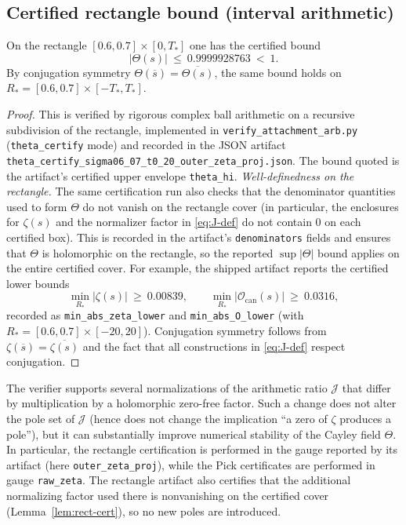 \documentclass[11pt]{article}
\begin{document}
\subsection*{Certified rectangle bound (interval arithmetic)}
\begin{lemma}\label{lem:rect-cert}
On the rectangle $[0.6,0.7]\times[0,T_\ast]$ one has the certified bound
\[
  |\Theta(s)|\ \le\ 0.9999928763\ <\ 1.
\]
By conjugation symmetry $\Theta(\overline{s})=\overline{\Theta(s)}$, the same bound holds on $R_\ast=[0.6,0.7]\times[-T_\ast,T_\ast]$.
\end{lemma}
\begin{proof}
This is verified by rigorous complex ball arithmetic on a recursive subdivision of the rectangle, implemented in \texttt{verify\_attachment\_arb.py} (\texttt{theta\_certify} mode) and recorded in the JSON artifact
\texttt{theta\_certify\_sigma06\_07\_t0\_20\_outer\_zeta\_proj.json}.
The bound quoted is the artifact’s certified upper envelope \texttt{theta\_hi}.
\emph{Well-definedness on the rectangle.}
The same certification run also checks that the denominator quantities used to form $\Theta$ do not vanish on the rectangle cover (in particular, the enclosures for $\zeta(s)$ and the normalizer factor in \eqref{eq:J-def} do not contain $0$ on each certified box).
This is recorded in the artifact’s \texttt{denominators} fields and ensures that $\Theta$ is holomorphic on the rectangle, so the reported $\sup|\Theta|$ bound applies on the entire certified cover.
For example, the shipped artifact reports the certified lower bounds
\[
  \min_{R_\ast}|\zeta(s)|\ \ge\ 0.00839,\qquad \min_{R_\ast}|\mathcal O_{\mathrm{can}}(s)|\ \ge\ 0.0316,
\]
recorded as \texttt{min\_abs\_zeta\_lower} and \texttt{min\_abs\_O\_lower} (with $R_\ast=[0.6,0.7]\times[-20,20]$).
Conjugation symmetry follows from $\zeta(\overline{s})=\overline{\zeta(s)}$ and the fact that all constructions in \eqref{eq:J-def} respect conjugation.
\end{proof}

\begin{remark}\label{rem:gauges}
The verifier supports several normalizations of the arithmetic ratio $\mathcal J$ that differ by multiplication by a holomorphic zero-free factor.
Such a change does not alter the pole set of $\mathcal J$ (hence does not change the implication ``a zero of $\zeta$ produces a pole''), but it can substantially improve numerical stability of the Cayley field $\Theta$.
In particular, the rectangle certification is performed in the gauge reported by its artifact (here \texttt{outer\_zeta\_proj}), while the Pick certificates are performed in gauge \texttt{raw\_zeta}.
The rectangle artifact also certifies that the additional normalizing factor used there is nonvanishing on the certified cover (Lemma~\ref{lem:rect-cert}), so no new poles are introduced.
\end{remark}
\end{document}
